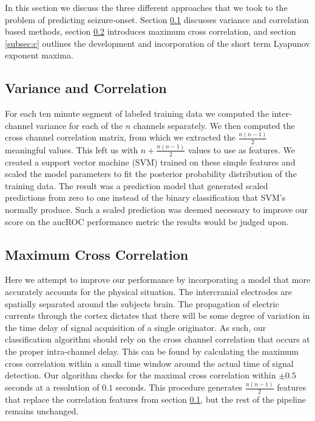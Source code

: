 In this section we discuss the three different approaches that we took to the problem of predicting seizure-onset.  Section \ref{subsec:a} discusses variance and correlation based methods, section \ref{subsec:b} introduces maximum cross correlation, and section \ref{subsec:c} outlines the development and incorporation of the short term Lyapunov exponent maxima.

\subsection{Variance and Correlation} \label{subsec:a}
For each ten minute segment of labeled training data we computed the inter-channel variance for each of the $n$ channels separately.  We then computed the cross channel correlation matrix, from which we extracted the $\frac{n(n-1)}{2}$ meaningful values.  This left us with $n + \frac{n(n-1)}{2}$ values to use as features.  We created a support vector machine (SVM) trained on these simple features and scaled the model parameters to fit the posterior probability distribution of the training data.  The result was a prediction model that generated scaled predictions from zero to one instead of the binary classification that SVM's normally produce.  Such a scaled prediction was deemed necessary to improve our score on the aucROC performance metric the results would be judged upon.

\subsection{Maximum Cross Correlation} \label{subsec:b}
Here we attempt to improve our performance by incorporating a model that more accurately accounts for the physical situation.  The intercranial electrodes are spatially separated around the subjects brain.  The propagation of electric currents through the cortex dictates that there will be some degree of variation in the time delay of signal acquisition of a single originator.  As such, our classification algorithm should rely on the cross channel correlation that occurs at the proper intra-channel delay.  This can be found by calculating the maximum cross correlation within a small time window around the actual time of signal detection.  Our algorithm checks for the maximal cross correlation within $\pm0.5$ seconds at a resolution of $0.1$ seconds.  This procedure generates $\frac{n(n-1)}{2}$ features that replace the correlation features from section \ref{subsec:a}, but the rest of the pipeline remains unchanged.

